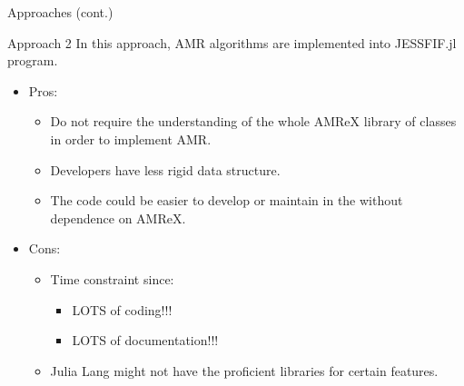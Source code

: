 \documentclass[\string~/GitHub/sthlmNordBeamerTheme/sthlmNordLightDemo.tex]{subfiles}
\begin{document}
\begin{frame}[c]{Approaches (cont.)}
    
    \begin{block}{Approach 2}
        In this approach, AMR algorithms are implemented into JESSFIF.jl program.
    \end{block}
    
    \begin{itemize}
        \item Pros:
            \begin{itemize}
                \item Do not require the understanding of the whole AMReX library of classes in order to implement AMR.
                \item Developers have less rigid data structure.
                \item The code could be easier to develop or maintain in the without dependence on AMReX.
            \end{itemize}
        \item Cons:
            \begin{itemize}
                \item Time constraint since:
                    \begin{itemize}
                        \item LOTS of coding!!!
                        \item LOTS of documentation!!!
                    \end{itemize}
                \item Julia Lang might not have the proficient libraries for certain features.
            \end{itemize}
    \end{itemize}
 
\end{frame}
\end{document}
